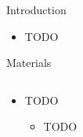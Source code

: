 \documentclass[final,hyperref={pdfpagelabels=false}]{beamer}
\begin{document}
\begin{frame}[t]
\begin{columns}[t]
\begin{column}{.465\textwidth}
\begin{block}{Introduction}
\begin{itemize}
\item TODO
\end{itemize}

\end{block}


\begin{block}{Materials}

\begin{columns} %
\begin{column}{.54\textwidth} %
\begin{itemize}

\item TODO
\begin{itemize}
\item TODO
\end{itemize}


\end{itemize}
\end{column}


\end{columns}
\end{block}
\end{column}
\end{columns}
\end{frame}
\end{document}
